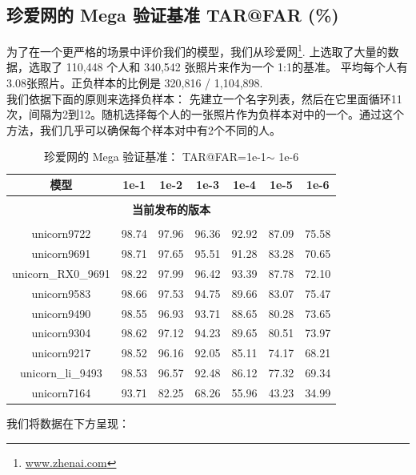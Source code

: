 \documentclass[a4paper, 11pt, UTF8]{ctexart}%
\begin{document}
\subsection{珍爱网的 Mega 验证基准 TAR@FAR (\%)}
为了在一个更严格的场景中评价我们的模型，我们从珍爱网\footnote{\url{www.zhenai.com}}. 上选取了大量的数据，选取了 110,448 个人和 340,542 张照片来作为一个 1:1的基准。 平均每个人有3.08张照片。正负样本的比例是 320,816 / 1,104,898.\\
我们依据下面的原则来选择负样本：
先建立一个名字列表，然后在它里面循环11次，间隔为2到12。随机选择每个人的一张照片作为负样本对中的一个。通过这个方法，我们几乎可以确保每个样本对中有2个不同的人。

\begin{table}[h]
\caption{珍爱网的 Mega 验证基准： TAR@FAR=1e-1$\sim$ 1e-6}
\label{table:megabench}
\begin{center}
\begin{tabular}{ccccccc}
\multicolumn{1}{c}{\bf 模型}  &\multicolumn{1}{c}{\bf 1e-1} &\multicolumn{1}{c}{\bf 1e-2} &\multicolumn{1}{c}{\bf 1e-3} &\multicolumn{1}{c}{\bf 1e-4} &\multicolumn{1}{c}{\bf 1e-5} &\multicolumn{1}{c}{\bf 1e-6}
\\ \hline \\
\multicolumn{7}{c}{\bf 当前发布的版本}\\
\\
unicorn9722 &  98.74 & 97.96 & 96.36 & 92.92 & 87.09 & 75.58 \\
unicorn9691 &  98.71 & 97.65 & 95.51 & 91.28 & 83.28 & 70.65 \\
unicorn\_RX0\_9691 &  98.22 & 97.99 & 96.42 & 93.39 & 87.78 & 72.10 \\
unicorn9583 &  98.66 & 97.53 & 94.75 & 89.66 & 83.07 & 75.47 \\
unicorn9490 &  98.55 & 96.93 & 93.71 & 88.65 & 80.28 & 73.65 \\
unicorn9304 &  98.62 & 97.12 & 94.23 & 89.65 & 80.51 & 73.97 \\
unicorn9217 &  98.52 & 96.16 & 92.05 & 85.11 & 74.17 & 68.21 \\
unicorn\_li\_9493 &  98.53 & 96.57 & 92.48 & 86.12 & 77.32 & 69.34\\
unicorn7164 &  93.71 & 82.25 & 68.26 & 55.96 & 43.23 & 34.99 \\
\end{tabular}
\end{center}
\end{table}

我们将数据在下方呈现：
\end{document}
